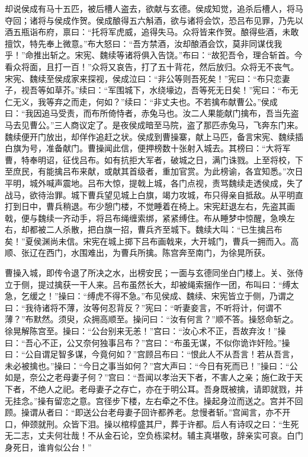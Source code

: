 却说侯成有马十五匹，被后槽人盗去，欲献与玄德。侯成知觉，追杀后槽人，将马夺回；诸将与侯成作贺。侯成酿得五六斛酒，欲与诸将会饮，恐吕布见罪，乃先以酒五瓶诣布府，禀曰：“托将军虎威，追得失马。众将皆来作贺。酿得些酒，未敢擅饮，特先奉上微意。”布大怒曰：“吾方禁酒，汝却酿酒会饮，莫非同谋伐我乎！”命推出斩之。宋宪、魏续等诸将俱入告饶。”布曰：“故犯吾令，理合斩首。今看众将面，且打一百！”众将又哀告，打了五十背花，然后放归。众将无不丧气。宋宪、魏续至侯成家来探视，侯成泣曰：“非公等则吾死矣！”宪曰：“布只恋妻子，视吾等如草芥。”续曰：“军围城下，水绕壕边，吾等死无日矣！”宪曰：“布无仁无义，我等弃之而走，何如？”续曰：“非丈夫也。不若擒布献曹公。”侯成曰：“我因追马受责，而布所倚恃者，赤兔马也。汝二人果能献门擒布，吾当先盗马去见曹公。”三人商议定了。是夜侯成暗至马院，盗了那匹赤兔马，飞奔东门来。魏续便开门放出，却佯作追赶之状。侯成到曹操寨，献上马匹，备言宋宪、魏续插白旗为号，准备献门。曹操闻此信，便押榜数十张射入城去。其榜曰：“大将军曹，特奉明诏，征伐吕布。如有抗拒大军者，破城之日，满门诛戮。上至将校，下至庶民，有能擒吕布来献，或献其首级者，重加官赏。为此榜谕，各宜知悉。”次日平明，城外喊声震地。吕布大惊，提戟上城，各门点视，责骂魏续走透侯成，失了战马，欲待治罪。城下曹兵望见城上白旗，竭力攻城，布只得亲自抵敌。从平明直打到日中，曹兵稍退。布少憩门楼，不觉睡着在椅上。宋宪赶退左右，先盗其画戟，便与魏续一齐动手，将吕布绳缠索绑，紧紧缚住。布从睡梦中惊醒，急唤左右，却都被二人杀散，把白旗一招，曹兵齐至城下。魏续大叫：“已生擒吕布矣！”夏侯渊尚未信。宋宪在城上掷下吕布画戟来，大开城门，曹兵一拥而入。高顺、张辽在西门，水围难出，为曹兵所擒。陈宫奔至南门，为徐晃所获。

曹操入城，即传令退了所决之水，出榜安民；一面与玄德同坐白门楼上。关、张侍立于侧，提过擒获一干人来。吕布虽然长大，却被绳索捆作一团，布叫曰：“缚太急，乞缓之！”操曰：“缚虎不得不急。”布见侯成、魏续、宋宪皆立于侧，乃谓之曰：“我待诸将不薄，汝等何忍背反？”宪曰：“听妻妾言，不听将计，何谓不薄？”布默然。须臾，众拥高顺至。操问曰：“汝有何言？”顺不答。操怒命斩之。徐晃解陈宫至。操曰：“公台别来无恙！”宫曰：“汝心术不正，吾故弃汝！”操曰：“吾心不正，公又奈何独事吕布？”宫曰：“布虽无谋，不似你诡诈奸险。”操曰：“公自谓足智多谋，今竟何如？”宫顾吕布曰：“恨此人不从吾言！若从吾言，未必被擒也。”操曰：“今日之事当如何？”宫大声曰：“今日有死而已！”操曰：“公如是，奈公之老母妻子何？”宫曰：“吾闻以孝治天下者，不害人之亲；施仁政于天下者，不绝人之祀。老母妻子之存亡，亦在于明公耳。吾身既被擒，请即就戮，并无挂念。”操有留恋之意。宫径步下楼，左右牵之不住。操起身泣而送之。宫并不回顾。操谓从者曰：“即送公台老母妻子回许都养老。怠慢者斩。”宫闻言，亦不开口，伸颈就刑。众皆下泪。操以棺椁盛其尸，葬于许都。后人有诗叹之曰：“生死无二志，丈夫何壮哉！不从金石论，空负栋梁材。辅主真堪敬，辞亲实可哀。白门身死日，谁肯似公台！”

